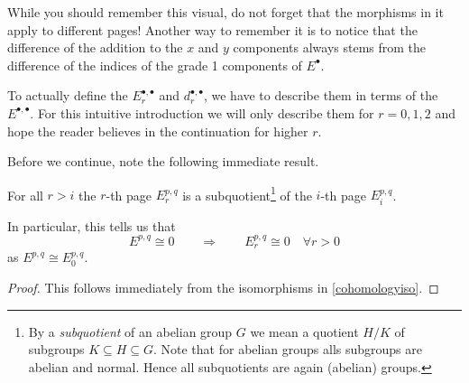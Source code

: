 \begin{center}
\end{center}
While you should remember this visual, do not forget that the morphisms in it apply to different pages! Another way to remember it is to notice that the difference of the addition to the $x$ and $y$ components always stems from the difference of the indices of the grade 1 components of $E^\bullet$.

To actually define  the $E_r^{\bullet, \bullet}$ and $d^{\bullet, \bullet}_r$, we have to describe them in terms of the $E^{\bullet, \bullet}$.  For this intuitive introduction we will only describe them for $r= 0, 1, 2$ and hope the reader believes in the continuation for higher $r$.

Before we continue, note the following immediate result.
\begin{lemma}
    For all $r>i$ the $r$-th page $E^{p,q}_r$ is a subquotient\footnote{By a \textit{subquotient} of an abelian group $G$ we mean a quotient $H/K$ of subgroups $K\subseteq H\subseteq G$. Note that for abelian groups alls subgroups are abelian and normal. Hence all subquotients are again (abelian) groups.} of the $i$-th page $E^{p,q}_i$.

    In particular, this tells us that
    \begin{equation*}
         E^{p,q}\cong 0 \qquad \Rightarrow \qquad E^{p,q}_r \cong 0 \quad \forall r>0
    \end{equation*}
    as $E^{p,q} \cong E^{p,q}_0$.
\end{lemma}
\begin{proof}
    This follows immediately from the isomorphisms in \ref{cohomologyiso}.
\end{proof}

